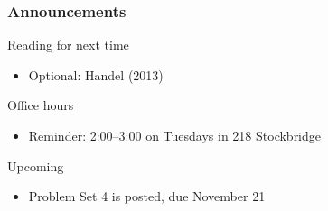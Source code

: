 \documentclass{beamer}
\begin{document}
\begin{frame}\frametitle{Announcements}
    Reading for next time
    \begin{itemize}
        \item Optional: Handel (2013)
    \end{itemize}
    \vspace{3ex}
    Office hours
    \begin{itemize}
    	\item Reminder: 2:00--3:00 on Tuesdays in 218 Stockbridge
    \end{itemize}
    \vspace{3ex}
    Upcoming
    \begin{itemize}
        \item Problem Set 4 is posted, due November 21
    \end{itemize}
\end{frame}
\end{document}
